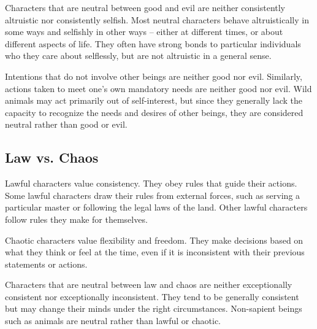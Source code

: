          Characters that are neutral between good and evil are neither consistently altruistic nor consistently selfish.
        Most neutral characters behave altruistically in some ways and selfishly in other ways -- either at different times, or about different aspects of life.
        They often have strong bonds to particular individuals who they care about selflessly, but are not altruistic in a general sense.

        Intentions that do not involve other beings are neither good nor evil.
        Similarly, actions taken to meet one's own mandatory needs are neither good nor evil.
        Wild animals may act primarily out of self-interest, but since they generally lack the capacity to recognize the needs and desires of other beings, they are considered neutral rather than good or evil.

    \subsection{Law vs. Chaos}
         Lawful characters value consistency.
        They obey rules that guide their actions.
        Some lawful characters draw their rules from external forces, such as serving a particular master or following the legal laws of the land.
        Other lawful characters follow rules they make for themselves.

         Chaotic characters value flexibility and freedom.
        They make decisions based on what they think or feel at the time, even if it is inconsistent with their previous statements or actions.

         Characters that are neutral between law and chaos are neither exceptionally consistent nor exceptionally inconsistent.
        They tend to be generally consistent but may change their minds under the right circumstances.
        Non-sapient beings such as animals are neutral rather than lawful or chaotic.

